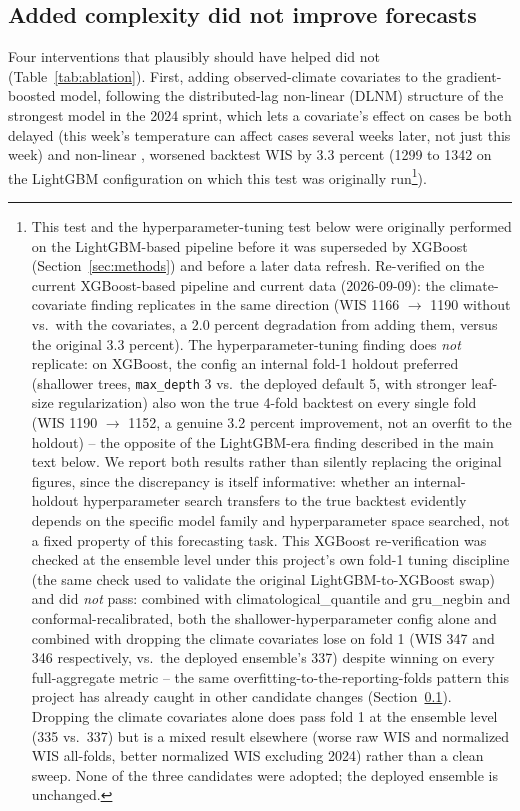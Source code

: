 \documentclass[11pt]{article}
\begin{document}
\subsection{Added complexity did not improve forecasts}\label{sec:negative}
Four interventions that plausibly should have helped did not (Table~\ref{tab:ablation}). First,
adding observed-climate covariates to the gradient-boosted model, following the distributed-lag
non-linear (DLNM) structure of the strongest model in the 2024 sprint, which lets a covariate's
effect on cases be both delayed (this week's temperature can affect cases several weeks later, not
just this week) and non-linear \citep{araujo2026,gasparrini2010},
worsened backtest WIS by 3.3 percent (1299 to 1342 on the LightGBM configuration on which this test
was originally run\footnote{This test and the hyperparameter-tuning test below were originally
performed on the LightGBM-based pipeline before it was superseded by XGBoost
(Section~\ref{sec:methods}) and before a later data refresh. Re-verified on the current
XGBoost-based pipeline and current data (2026-09-09): the climate-covariate finding replicates in
the same direction (WIS 1166 $\rightarrow$ 1190 without vs.\ with the covariates, a 2.0 percent
degradation from adding them, versus the original 3.3 percent). The hyperparameter-tuning finding
does \emph{not} replicate: on XGBoost, the config an internal fold-1 holdout preferred (shallower
trees, \texttt{max\_depth} 3 vs.\ the deployed default 5, with stronger leaf-size regularization)
also won the true 4-fold backtest on every single fold (WIS 1190 $\rightarrow$ 1152, a genuine 3.2
percent improvement, not an overfit to the holdout) -- the opposite of the LightGBM-era finding
described in the main text below. We report both results rather than silently replacing the
original figures, since the discrepancy is itself informative: whether an internal-holdout
hyperparameter search transfers to the true backtest evidently depends on the specific model
family and hyperparameter space searched, not a fixed property of this forecasting task. This
XGBoost re-verification was checked at the ensemble level under this project's own fold-1 tuning
discipline (the same check used to validate the original LightGBM-to-XGBoost swap) and did
\emph{not} pass: combined with climatological\_quantile and gru\_negbin and conformal-recalibrated,
both the shallower-hyperparameter config alone and combined with dropping the climate covariates
lose on fold 1 (WIS 347 and 346 respectively, vs.\ the deployed ensemble's 337) despite winning on
every full-aggregate metric -- the same overfitting-to-the-reporting-folds pattern this project has
already caught in other candidate changes (Section~\ref{sec:negative}). Dropping the climate
covariates alone does pass fold 1 at the ensemble level (335 vs.\ 337) but is a mixed result
elsewhere (worse raw WIS and normalized WIS all-folds, better normalized WIS excluding 2024) rather
than a clean sweep. None of the three candidates were adopted; the deployed ensemble is unchanged.}).
\end{document}
